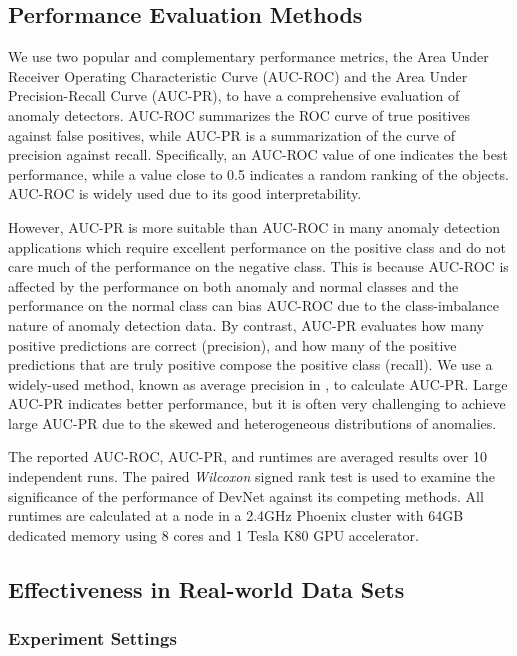 \documentclass[sigconf]{acmart}
\begin{document}
\subsection{Performance Evaluation Methods}
We use two popular and complementary performance metrics, the Area Under Receiver Operating Characteristic Curve (AUC-ROC) and the Area Under Precision-Recall Curve (AUC-PR), to have a comprehensive evaluation of anomaly detectors. AUC-ROC summarizes the ROC curve of true positives against false positives, while AUC-PR is a summarization of the curve of precision against recall. Specifically, an AUC-ROC value of one indicates the best performance, while a value close to 0.5 indicates a random ranking of the objects. AUC-ROC is widely used due to its good interpretability. 


However, AUC-PR is more suitable than AUC-ROC in many anomaly detection applications which require excellent performance on the positive class and do not care much of the performance on the negative class. This is because AUC-ROC is affected by the performance on both anomaly and normal classes and the performance on the normal class can bias AUC-ROC due to the class-imbalance nature of anomaly detection data. By contrast, AUC-PR evaluates how many positive predictions are correct (precision), and how many of the positive predictions that are truly positive compose the positive class (recall). We use a widely-used method, known as average precision in \cite{schutze2008introduction}, to calculate AUC-PR. Large AUC-PR indicates better performance, but it is often very challenging to achieve large AUC-PR due to the skewed and heterogeneous distributions of anomalies.

The reported AUC-ROC, AUC-PR, and runtimes are averaged results over 10 independent runs. The paired \textit{Wilcoxon} signed rank test \cite{woolson2007wilcoxon} is used to examine the significance of the performance of DevNet against its competing methods. All runtimes are calculated at a node in a 2.4GHz Phoenix cluster with 64GB dedicated memory using 8 cores and 1 Tesla K80 GPU accelerator. 



\subsection{Effectiveness in Real-world Data Sets}\label{exp:effectiveness}

\subsubsection{Experiment Settings}
\end{document}
